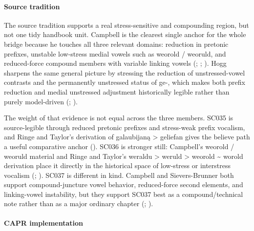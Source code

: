 \documentclass[
  british,
  a4paper,
]{article}
\begin{document}
\paragraph{Source tradition}\label{source-tradition-23}

The source tradition supports a real stress-sensitive and compounding
region, but not one tidy handbook unit. Campbell is the clearest single
anchor for the whole bridge because he touches all three relevant
domains: reduction in pretonic prefixes, unstable low-stress medial
vowels such as weorold / weoruld, and reduced-force compound members
with variable linking vowels (; ;
). Hogg
sharpens the same general picture by stressing the reduction of
unstressed-vowel contrasts and the permanently unstressed status of ge-,
which makes both prefix reduction and medial unstressed adjustment
historically legible rather than purely model-driven
(;
).

The weight of that evidence is not equal across the three members. SC035
is source-legible through reduced pretonic prefixes and stress-weak
prefix vocalism, and Ringe and Taylor's derivation of galaubijaną
\textgreater{} geliefan gives the believe path a useful comparative
anchor (). SC036 is stronger still: Campbell's weorold / weoruld material
and Ringe and Taylor's weraldu \textgreater{} weruld \textgreater{}
weorold \textasciitilde{} worold derivation place it directly in the
historical space of low-stress or interstress vocalism
(;
).
SC037 is different in kind. Campbell and Sievers-Brunner both support
compound-juncture vowel behavior, reduced-force second elements, and
linking-vowel instability, but they support SC037 best as a
compound/technical note rather than as a major ordinary chapter
(; ).

\paragraph{CAPR implementation}\label{capr-implementation-23}
\end{document}
